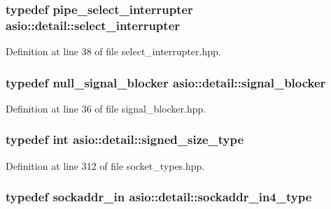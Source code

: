 \subsubsection[{select\+\_\+interrupter}]{\setlength{\rightskip}{0pt plus 5cm}typedef {\bf pipe\+\_\+select\+\_\+interrupter} {\bf asio\+::detail\+::select\+\_\+interrupter}}\label{namespaceasio_1_1detail_af134b6407cc041a03d1c0b8821ae00c1}


Definition at line 38 of file select\+\_\+interrupter.\+hpp.

\hypertarget{namespaceasio_1_1detail_a4ba936a7407061df651a0da023c9286c}{}
\subsubsection[{signal\+\_\+blocker}]{\setlength{\rightskip}{0pt plus 5cm}typedef {\bf null\+\_\+signal\+\_\+blocker} {\bf asio\+::detail\+::signal\+\_\+blocker}}\label{namespaceasio_1_1detail_a4ba936a7407061df651a0da023c9286c}


Definition at line 36 of file signal\+\_\+blocker.\+hpp.

\hypertarget{namespaceasio_1_1detail_a0912273eb9e5fcdaef1b12e9b77e9f07}{}
\subsubsection[{signed\+\_\+size\+\_\+type}]{\setlength{\rightskip}{0pt plus 5cm}typedef int {\bf asio\+::detail\+::signed\+\_\+size\+\_\+type}}\label{namespaceasio_1_1detail_a0912273eb9e5fcdaef1b12e9b77e9f07}


Definition at line 312 of file socket\+\_\+types.\+hpp.

\hypertarget{namespaceasio_1_1detail_a80851db41f97eb12822e2f409d444aa6}{}
\subsubsection[{sockaddr\+\_\+in4\+\_\+type}]{\setlength{\rightskip}{0pt plus 5cm}typedef sockaddr\+\_\+in {\bf asio\+::detail\+::sockaddr\+\_\+in4\+\_\+type}}\label{namespaceasio_1_1detail_a80851db41f97eb12822e2f409d444aa6}



